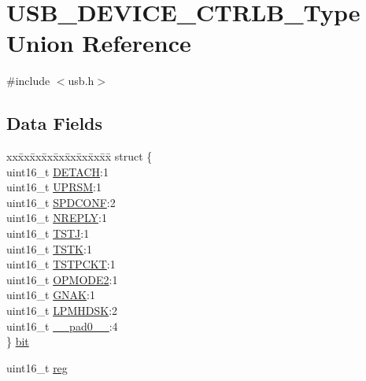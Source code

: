 \hypertarget{union_u_s_b___d_e_v_i_c_e___c_t_r_l_b___type}{}\section{U\+S\+B\+\_\+\+D\+E\+V\+I\+C\+E\+\_\+\+C\+T\+R\+L\+B\+\_\+\+Type Union Reference}
\label{union_u_s_b___d_e_v_i_c_e___c_t_r_l_b___type}


{\ttfamily \#include $<$usb.\+h$>$}

\subsection*{Data Fields}
\begin{DoxyCompactItemize}
\item 
\begin{tabbing}
xx\=xx\=xx\=xx\=xx\=xx\=xx\=xx\=xx\=\kill
struct \{\\
\>uint16\_t \mbox{\hyperlink{union_u_s_b___d_e_v_i_c_e___c_t_r_l_b___type_aca94b8065e34fdec0f7cc07d000952a0}{DETACH}}:1\\
\>uint16\_t \mbox{\hyperlink{union_u_s_b___d_e_v_i_c_e___c_t_r_l_b___type_a21d16bc73d976e53f035b7dd20e1160b}{UPRSM}}:1\\
\>uint16\_t \mbox{\hyperlink{union_u_s_b___d_e_v_i_c_e___c_t_r_l_b___type_a390a52aee14f964d6771fce88855d682}{SPDCONF}}:2\\
\>uint16\_t \mbox{\hyperlink{union_u_s_b___d_e_v_i_c_e___c_t_r_l_b___type_a7b3ebc042e1e7e6123b9032e33b57995}{NREPLY}}:1\\
\>uint16\_t \mbox{\hyperlink{union_u_s_b___d_e_v_i_c_e___c_t_r_l_b___type_a93ebd73b77f14261ceea0868eabbba4c}{TSTJ}}:1\\
\>uint16\_t \mbox{\hyperlink{union_u_s_b___d_e_v_i_c_e___c_t_r_l_b___type_a99db242eb0068c623d4fa3bff4698d3d}{TSTK}}:1\\
\>uint16\_t \mbox{\hyperlink{union_u_s_b___d_e_v_i_c_e___c_t_r_l_b___type_ac99660ce22296d61a7086073666dd572}{TSTPCKT}}:1\\
\>uint16\_t \mbox{\hyperlink{union_u_s_b___d_e_v_i_c_e___c_t_r_l_b___type_aac3968ee46913a3ed107672aa724f47e}{OPMODE2}}:1\\
\>uint16\_t \mbox{\hyperlink{union_u_s_b___d_e_v_i_c_e___c_t_r_l_b___type_a51db4e96cb0c0e0c1aab09dfd97f1a38}{GNAK}}:1\\
\>uint16\_t \mbox{\hyperlink{union_u_s_b___d_e_v_i_c_e___c_t_r_l_b___type_a65059182fabbb131b9e849815e04725d}{LPMHDSK}}:2\\
\>uint16\_t \mbox{\hyperlink{union_u_s_b___d_e_v_i_c_e___c_t_r_l_b___type_a77132c2c26a75f5b8751b235cda23828}{\_\_pad0\_\_}}:4\\
\} \mbox{\hyperlink{union_u_s_b___d_e_v_i_c_e___c_t_r_l_b___type_a5acf88999e8fb9d602eef74316d95d54}{bit}}\\

\end{tabbing}\item 
uint16\+\_\+t \mbox{\hyperlink{union_u_s_b___d_e_v_i_c_e___c_t_r_l_b___type_a11760f5020019f4aa8cb02e694f7cc44}{reg}}
\end{DoxyCompactItemize}



